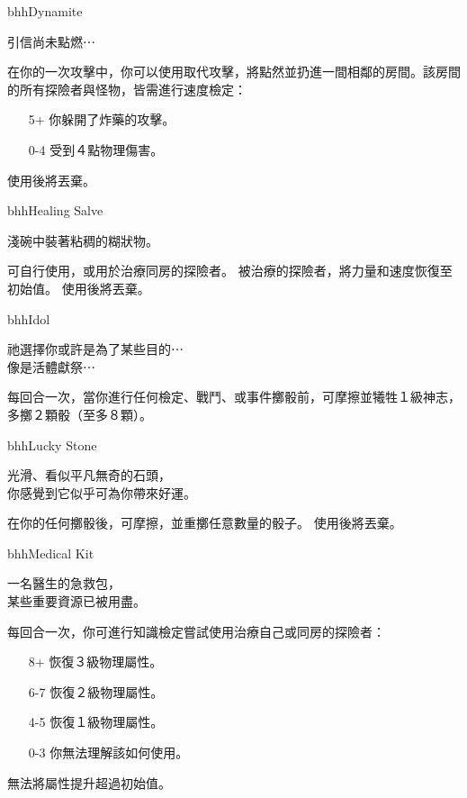 %
\begin{ItemCard}{bhh}{Dynamite}
  \begin{CardStory}
    引信尚未點燃⋯
  \end{CardStory}
  在你的一次攻擊中，你可以使用\ThisName{}取代攻擊，將\ThisName{}點然並扔進一間相鄰的房間。該房間的所有探險者與怪物，皆需進行速度檢定：
  \begin{itemize}
    \item[5+] 你躲開了炸藥的攻擊。
    \item[0-4] 受到４點物理傷害。
  \end{itemize}
  使用後將\ThisName{}丟棄。\smallskip
\end{ItemCard}%
%
\begin{ItemCard}{bhh}{Healing Salve}
  \begin{CardStory}
    淺碗中裝著粘稠的糊狀物。
  \end{CardStory}
  可自行使用，或用於治療同房的探險者。\smallskip
  被\ThisName{}治療的探險者，將力量和速度恢復至初始值。\smallskip
  使用後將\ThisName{}丟棄。\smallskip
\end{ItemCard}%
%
\begin{ItemCard}{bhh}{Idol}
  \begin{CardStory}
    祂選擇你或許是為了某些目的⋯\\
    像是活體獻祭⋯
  \end{CardStory}
  每回合一次，當你進行任何檢定、戰鬥、或事件擲骰前，可摩擦\ThisName{}並犧牲１級神志，多擲２顆骰（至多８顆）。\smallskip
\end{ItemCard}%
%
\begin{ItemCard}{bhh}{Lucky Stone}
  \begin{CardStory}
    光滑、看似平凡無奇的石頭，\\
    你感覺到它似乎可為你帶來好運。
  \end{CardStory}
  在你的任何擲骰後，可摩擦\ThisName{}，並重擲任意數量的骰子。\smallskip
  使用後將\ThisName{}丟棄。\smallskip
\end{ItemCard}%
%
\begin{ItemCard}{bhh}{Medical Kit}
  \begin{CardStory}
    一名醫生的急救包，\\
    某些重要資源已被用盡。
  \end{CardStory}
  每回合一次，你可進行知識檢定嘗試使用\ThisName{}治療自己或同房的探險者：
  \begin{itemize}
    \item[8+] 恢復３級物理屬性。
    \item[6-7] 恢復２級物理屬性。
    \item[4-5] 恢復１級物理屬性。
    \item[0-3] 你無法理解\ThisName{}該如何使用。
  \end{itemize}
  \ThisName{}無法將屬性提升超過初始值。\smallskip
\end{ItemCard}%
